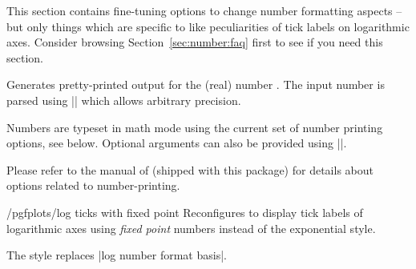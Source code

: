 This section contains fine-tuning options to change number formatting aspects
-- but only things which are specific to \PGFPlots{} like peculiarities of tick
labels on logarithmic axes. Consider browsing Section~\ref{sec:number:faq}
first to see if you need this section.

\begin{command}{\pgfmathprintnumber{}}
    Generates pretty-printed output for the (real) number . The input
    number  is parsed using |\pgfmathfloatparsenumber| which allows
    arbitrary precision.

    Numbers are typeset in math mode using the current set of number printing
    options, see below. Optional arguments can also be provided using
    ||.

    Please refer to the manual of \PGFPlotstable{} (shipped with this package)
    for details about options related to number-printing.
\end{command}

\begin{stylekey}{/pgfplots/log ticks with fixed point}
    Reconfigures \PGFPlots{} to display tick labels of logarithmic axes using
    \emph{fixed point} numbers instead of the exponential style.
\begin{codeexample}[]
\end{codeexample}

\begin{codeexample}[]
\end{codeexample}

    The style replaces |log number format basis|.
\end{stylekey}

